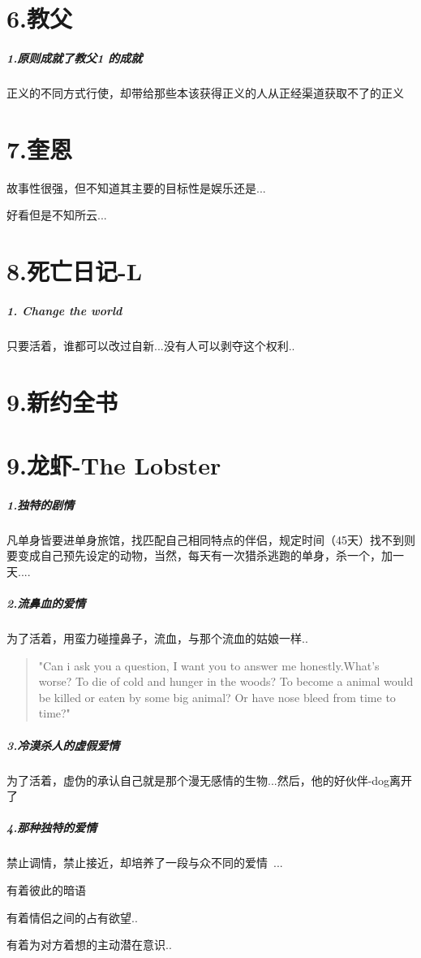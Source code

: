 \documentclass[UTF8,a4paper,8pt]{ctexbook}
\begin{document}
	\newpage
	 \section*{6.教父 }
		 \subparagraph{1.原则成就了教父1 的成就}正义的不同方式行使，却带给那些本该获得正义的人从正经渠道获取不了的正义
	 
	 
	\newpage
	 \section*{7.奎恩}
	 故事性很强，但不知道其主要的目标性是娱乐还是...
	 
	 好看但是不知所云...
	 
	 
	\newpage
	 \section*{8.死亡日记-L}
		 \subparagraph{1. Change the world}只要活着，谁都可以改过自新...没有人可以剥夺这个权利..

	\newpage 
	 \section*{9.新约全书}
	 
	 
	 
	\newpage
	\section*{9.龙虾-The Lobster}
		\subparagraph{1.独特的剧情}凡单身皆要进单身旅馆，找匹配自己相同特点的伴侣，规定时间（45天）找不到则要变成自己预先设定的动物，当然，每天有一次猎杀逃跑的单身，杀一个，加一天....
		\subparagraph{2.流鼻血的爱情}为了活着，用蛮力碰撞鼻子，流血，与那个流血的姑娘一样..
			\begin{quote}
				"Can i ask you a question, I want you to answer me honestly.What's worse? To die of cold and hunger in the woods? To become a animal would be killed or eaten by some big animal?  Or have nose bleed from time to time?"
			\end{quote}
		
		
		\subparagraph{3.冷漠杀人的虚假爱情}为了活着，虚伪的承认自己就是那个漫无感情的生物...然后，他的好伙伴-dog离开了
		
		\subparagraph{4.那种独特的爱情}
			禁止调情，禁止接近，却培养了一段与众不同的爱情~...
		
			有着彼此的暗语
			
			有着情侣之间的占有欲望..
			
			有着为对方着想的主动潜在意识..
			
\end{document}
